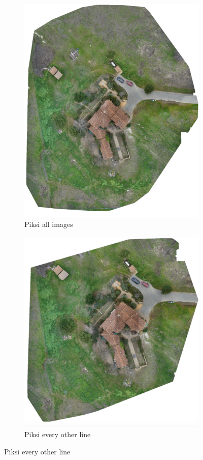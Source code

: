 \documentclass{article}
\begin{document}
\begin{figure}
\centering
\renewcommand*\thesubfigure{\arabic{subfigure}}
\begin{subfigure}{.33\textwidth}
  \centering
  \includegraphics[width=.72\linewidth]{images/orthomosaics/p.png}
  \caption{Piksi all images}
  \label{fig:sub1}
\end{subfigure}%
\begin{subfigure}{.33\textwidth}
  \centering
  \includegraphics[width=.72\linewidth]{images/orthomosaics/p_every_other_line.png}
  \caption{Piksi every other line}

\end{subfigure}
\end{figure}
\end{document}
